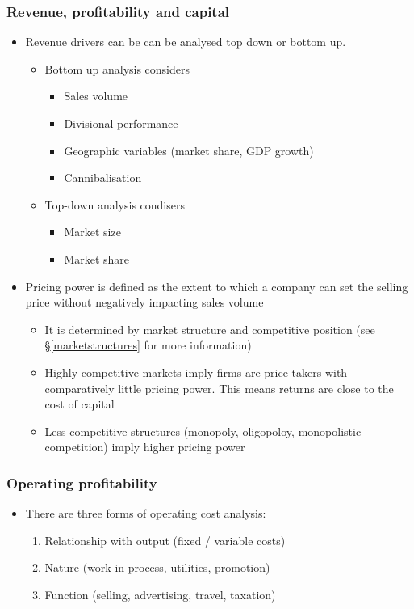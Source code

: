\documentclass[../notes_compiled.tex]{subfiles}
\begin{document}
\subsubsection{Revenue, profitability and capital}
\begin{itemize}
\item Revenue drivers can be can be analysed top down or bottom up.
\begin{itemize}
\item Bottom up analysis considers
\begin{itemize}
\item Sales volume
\item Divisional performance
\item Geographic variables (market share, GDP growth)
\item Cannibalisation
\end{itemize}
\item Top-down analysis condisers
\begin{itemize}
\item Market size
\item Market share
\end{itemize}
\end{itemize}
\item Pricing power is defined as the extent to which a company can set the selling price without negatively impacting sales volume
\begin{itemize}
\item It is determined by market structure and competitive position (see \S\ref{marketstructures} for more information)
\item Highly competitive markets imply firms are price-takers with comparatively little pricing power. This means returns are close to the cost of capital
\item Less competitive structures (monopoly, oligopoloy, monopolistic competition) imply higher pricing power
\end{itemize}
\end{itemize}


\subsubsection{Operating profitability}
\begin{itemize}
\item There are three forms of operating cost analysis:
\begin{enumerate}
\item Relationship with output (fixed / variable costs)
\item Nature (work in process, utilities, promotion)
\item Function (selling, advertising, travel, taxation)
\end{enumerate}
\end{itemize}
\end{document}
